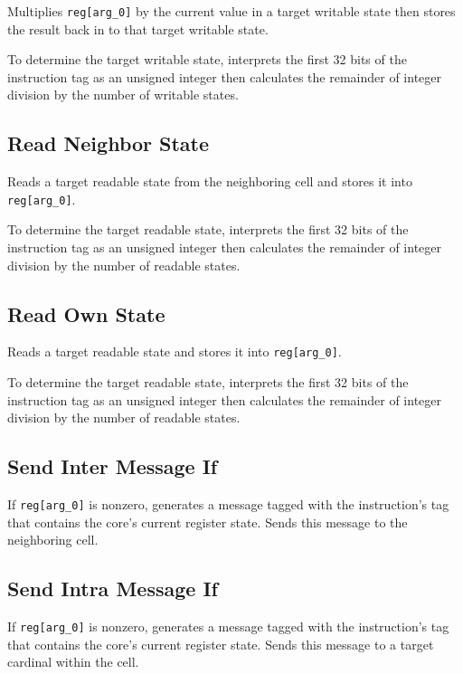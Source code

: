 
Multiplies \texttt{reg[arg\_0]} by the current value in a target writable state then stores the result back in to that target writable state.

To determine the target writable state, interprets the first 32 bits of the instruction tag as an unsigned integer then calculates the remainder of integer division by the number of writable states.

\subsection{Read Neighbor State}


Reads a target readable state from the neighboring cell and stores it into \texttt{reg[arg\_0]}.

To determine the target readable state, interprets the first 32 bits of the instruction tag as an unsigned integer then calculates the remainder of integer division by the number of readable states.

\subsection{Read Own State}


Reads a target readable state and stores it into \texttt{reg[arg\_0]}.

To determine the target readable state, interprets the first 32 bits of the instruction tag as an unsigned integer then calculates the remainder of integer division by the number of readable states.

\subsection{Send Inter Message If}


If \texttt{reg[arg\_0]} is nonzero, generates a message tagged with the instruction's tag that contains the core's current register state.
Sends this message to the neighboring cell.

\subsection{Send Intra Message If}


If \texttt{reg[arg\_0]} is nonzero, generates a message tagged with the instruction's tag that contains the core's current register state.
Sends this message to a target cardinal within the cell.

